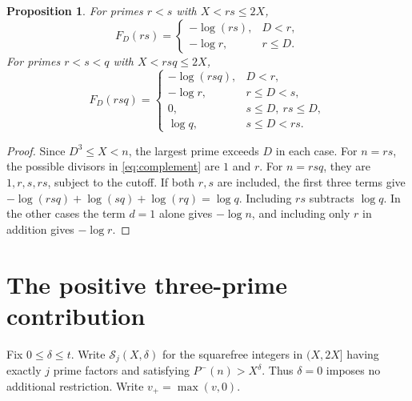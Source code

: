 \documentclass[11pt]{article}
\newtheorem{proposition}[theorem]{Proposition}
\begin{document}
\begin{proposition}\label{prop:signs}
For primes \(r<s\) with \(X<rs\le 2X\),
\[
 F_D(rs)=
 \begin{cases}
 -\log(rs),&D<r,\\
 -\log r,&r\le D.
 \end{cases}
\]
For primes \(r<s<q\) with \(X<rsq\le 2X\),
\[
 F_D(rsq)=
 \begin{cases}
 -\log(rsq),&D<r,\\
 -\log r,&r\le D<s,\\
 0,&s\le D,\ rs\le D,\\
 \log q,&s\le D<rs.
 \end{cases}
\]
\end{proposition}
\begin{proof}
Since \(D^3\le X<n\), the largest prime exceeds \(D\) in each case.
For \(n=rs\), the possible divisors in \eqref{eq:complement} are
\(1\) and \(r\). For \(n=rsq\), they are \(1,r,s,rs\), subject to
the cutoff. If both \(r,s\) are included, the first three terms
give \(-\log(rsq)+\log(sq)+\log(rq)=\log q\). Including \(rs\)
subtracts \(\log q\). In the other cases the term \(d=1\) alone gives
\(-\log n\), and including only \(r\) in addition gives \(-\log r\).
\end{proof}

\section{The positive three-prime contribution}

Fix \(0\le\delta\le t\). Write \(\mathcal S_j(X,\delta)\) for the
squarefree integers in \((X,2X]\) having exactly \(j\) prime factors
and satisfying \(P^-(n)>X^\delta\). Thus \(\delta=0\) imposes no
additional restriction. Write \(v_+=\max(v,0)\).
\end{document}

